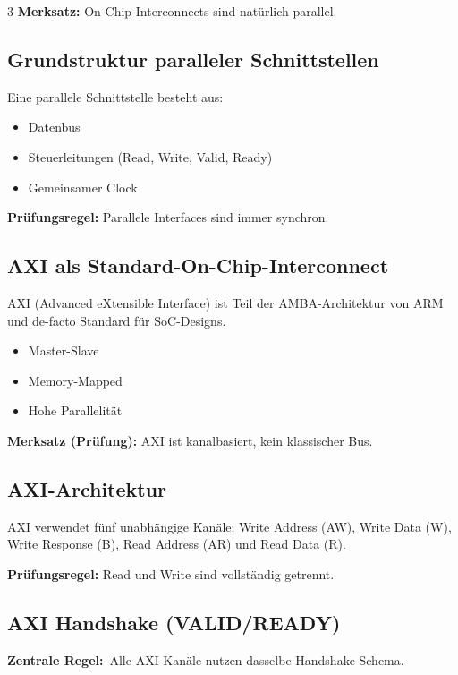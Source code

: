 \documentclass[10pt,a4paper]{article}
\newcommand{\pcentral}[1]{\textbf{\textcolor{examMagenta}{Zentrale Regel:}}~#1}
\newcommand{\hilite}[1]{\colorbox{yellow!25}{#1}}
\newcommand{\imp}[1]{\textbf{\textcolor{codeemph}{#1}}}
\begin{document}
\begin{multicols}{3}
\textbf{Merksatz:}  
\hilite{On-Chip-}\hilite{Interconnect}s sind \hilite{natürlich} parallel.

\subsection{Grundstruktur paralleler Schnittstellen}
Eine parallele Schnittstelle besteht aus:

\begin{itemize}
  \item Datenbus
  \item Steuerleitungen (Read, Write, Valid, Ready)
  \item Gemeinsamer Clock
\end{itemize}

\imp{Prüfungsregel:}  
\hilite{Parallele} \hilite{Interfaces} sind immer \hilite{synchron}.

\subsection{AXI als Standard-On-Chip-Interconnect}
AXI (Advanced eXtensible Interface) ist Teil der AMBA-Architektur von ARM und de-facto Standard für SoC-Designs.

\begin{itemize}
  \item Master-Slave
  \item Memory-Mapped
  \item Hohe Parallelität
\end{itemize}

\imp{Merksatz (Prüfung):}  
\hilite{AXI} ist \hilite{kanalbasiert}, kein \hilite{klassischer} Bus.

\subsection{AXI-Architektur}
AXI verwendet fünf unabhängige Kanäle: Write Address (AW), Write Data (W), Write Response (B), Read Address (AR) und Read Data (R).


\imp{Prüfungsregel:}  
\hilite{Read} und \hilite{Write} sind \hilite{vollständig} getrennt.

\subsection{AXI Handshake (VALID/READY)}

\pcentral{Alle AXI-Kanäle nutzen dasselbe Handshake-Schema.}


\end{multicols}
\end{document}
